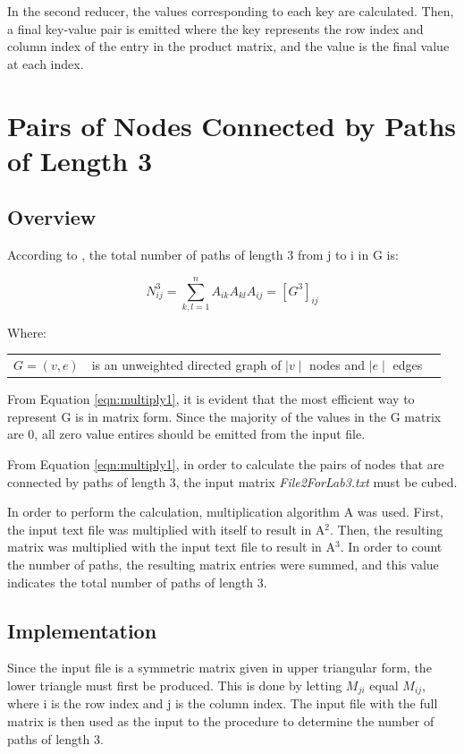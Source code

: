 \documentclass[10pt,twocolumn]{witseiepaper}
\begin{document}
In the second reducer, the values corresponding to each key are calculated. Then, a final key-value pair is emitted where the key represents the row index and column index of the entry in the product matrix, and the value is the final value at each index.

\section{Pairs of Nodes Connected by Paths of Length 3}
\subsection{Overview}
According to \cite{pathLength3}, the total number of paths of length 3 from j to i in G is:

 \begin{equation}
N_{ij}^{3} = \sum _{k,l = 1}^{n} A_{ik}A_{kl}A_{ij} = [G^{3}]_{ij}
\label{eqn:multiply1}
\end{equation}

Where:
\begin{tabular}{lll}
	$G = (v,e)$           &  is an unweighted directed graph of $\mid v \mid$ nodes and $\mid e \mid$ edges \\
\end{tabular}

From Equation \ref{eqn:multiply1}, it is evident that the most efficient way to represent G is in matrix form. Since the majority of the values in the G matrix are 0, all zero value entires should be emitted from the input file.

From Equation \ref{eqn:multiply1}, in order to calculate the pairs of nodes that are connected by paths of length 3, the input matrix \textit{File2ForLab3.txt} must be cubed.

In order to perform the calculation, multiplication algorithm A was used. First, the input text file was multiplied with itself to result in A$^{2}$. Then, the resulting matrix was multiplied with the input text file to result in A$^{3}$. In order to count the number of paths, the resulting matrix entries were summed, and this value indicates the total number of paths of length 3.

\subsection{Implementation} 
Since the input file is a symmetric matrix given in upper triangular form, the lower triangle must first be produced. This is done by letting $M_{ji}$ equal $M_{ij}$, where i is the row index and j is the column index. The input file with the full matrix is then used as the input to the procedure to determine the number of paths of length 3.
\end{document}
